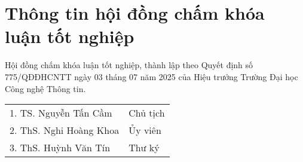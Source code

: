 \chapter*{\centering\Large{Thông tin hội đồng chấm khóa luận tốt nghiệp}}
Hội đồng chấm khóa luận tốt nghiệp, thành lập theo Quyết định số 775/QĐĐHCNTT ngày 03 tháng 07 năm 2025 của Hiệu trưởng Trường Đại học Công nghệ Thông tin.
\begin{center}
    \begin{tabular}{ p{} p{}} 
        1. TS. Nguyễn Tấn Cầm    & Chủ tịch \\
        2. ThS. Nghi Hoàng Khoa & Ủy viên \\ 
        3. ThS. Huỳnh Văn Tín    & Thư ký \\ 
    \end{tabular} 
\end{center}